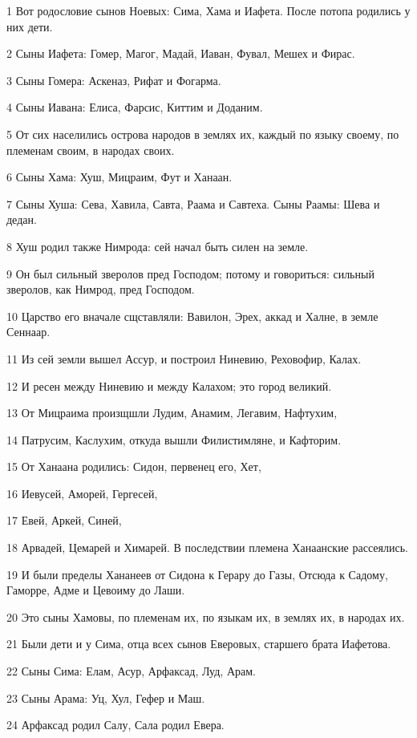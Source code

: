 \par 1 Вот родословие сынов Ноевых: Сима, Хама и Иафета. После потопа родились у них дети.
\par 2 Сыны Иафета: Гомер, Магог, Мадай, Иаван, Фувал, Мешех и Фирас.
\par 3 Сыны Гомера: Аскеназ, Рифат и Фогарма.
\par 4 Сыны Иавана: Елиса, Фарсис, Киттим и Доданим.
\par 5 От сих населились острова народов в землях их, каждый по языку своему, по племенам своим, в народах своих.
\par 6 Сыны Хама: Хуш, Мицраим, Фут и Ханаан.
\par 7 Сыны Хуша: Сева, Хавила, Савта, Раама и Савтеха. Сыны Раамы: Шева и дедан.
\par 8 Хуш родил также Нимрода: сей начал быть силен на земле.
\par 9 Он был сильный зверолов пред Господом; потому и говориться: сильный зверолов, как Нимрод, пред Господом.
\par 10 Царство его вначале сщставляли: Вавилон, Эрех, аккад и Халне, в земле Сеннаар.
\par 11 Из сей земли вышел Ассур, и построил Ниневию, Реховофир, Калах.
\par 12 И ресен между Ниневию и между Калахом; это город великий.
\par 13 От Мицраима произщшли Лудим, Анамим, Легавим, Нафтухим,
\par 14 Патрусим, Каслухим, откуда вышли Филистимляне, и Кафторим.
\par 15 От Ханаана родились: Сидон, первенец его, Хет,
\par 16 Иевусей, Аморей, Гергесей,
\par 17 Евей, Аркей, Синей,
\par 18 Арвадей, Цемарей и Химарей. В последствии племена Ханаанские рассеялись.
\par 19 И были пределы Хананеев от Сидона к Герару до Газы, Отсюда к Садому, Гаморре, Адме и Цевоиму до Лаши.
\par 20 Это сыны Хамовы, по племенам их, по языкам их, в землях их, в народах их.
\par 21 Были дети и у Сима, отца всех сынов Еверовых, старшего брата Иафетова.
\par 22 Сыны Сима: Елам, Асур, Арфаксад, Луд, Арам.
\par 23 Сыны Арама: Уц, Хул, Гефер и Маш.
\par 24 Арфаксад родил Салу, Сала родил Евера.
